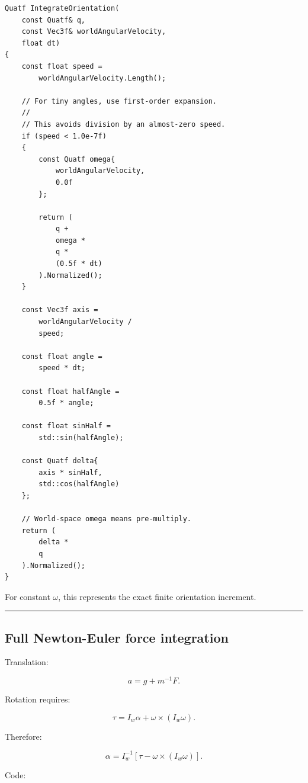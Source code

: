 \begin{verbatim}
Quatf IntegrateOrientation(
    const Quatf& q,
    const Vec3f& worldAngularVelocity,
    float dt)
{
    const float speed =
        worldAngularVelocity.Length();

    // For tiny angles, use first-order expansion.
    //
    // This avoids division by an almost-zero speed.
    if (speed < 1.0e-7f)
    {
        const Quatf omega{
            worldAngularVelocity,
            0.0f
        };

        return (
            q +
            omega *
            q *
            (0.5f * dt)
        ).Normalized();
    }

    const Vec3f axis =
        worldAngularVelocity /
        speed;

    const float angle =
        speed * dt;

    const float halfAngle =
        0.5f * angle;

    const float sinHalf =
        std::sin(halfAngle);

    const Quatf delta{
        axis * sinHalf,
        std::cos(halfAngle)
    };

    // World-space omega means pre-multiply.
    return (
        delta *
        q
    ).Normalized();
}
\end{verbatim}

For constant \(\omega\), this represents the exact finite orientation increment.

\begin{center}\rule{0.5\linewidth}{0.5pt}\end{center}

\subsection{Full Newton-Euler force integration}\label{06-engine-ii-ch039-full-newton-euler-force-integration}

Translation:

\[
a
=
g+
m^{-1}F.
\]

Rotation requires:

\[
\tau
=
I_w\alpha+
\omega\times(I_w\omega).
\]

Therefore:

\[
\boxed{
\alpha
=
I_w^{-1}
[
\tau-
\omega\times(I_w\omega)
].
}
\]

Code:

